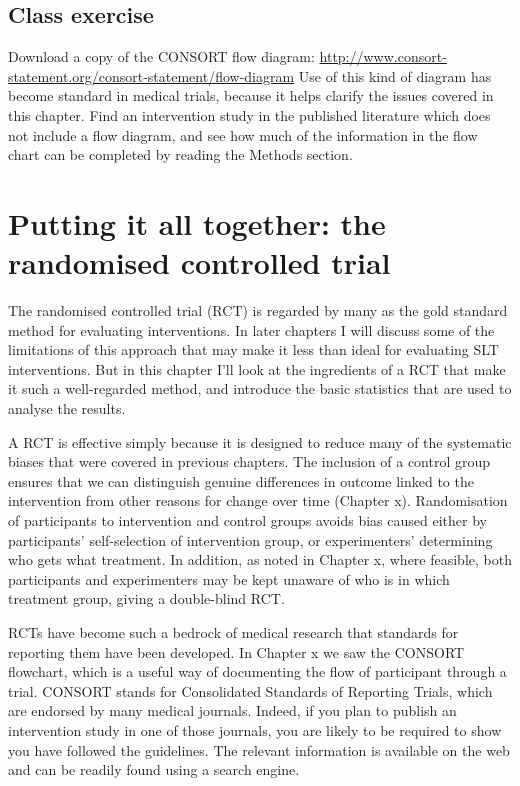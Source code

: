 \documentclass[]{book}
\begin{document}
\hypertarget{class-exercise-5}{%
\section{Class exercise}\label{class-exercise-5}}

Download a copy of the CONSORT flow diagram: \url{http://www.consort-statement.org/consort-statement/flow-diagram}
Use of this kind of diagram has become standard in medical trials, because it helps clarify the issues covered in this chapter.
Find an intervention study in the published literature which does not include a flow diagram, and see how much of the information in the flow chart can be completed by reading the Methods section.

\hypertarget{putting-it-all-together-the-randomised-controlled-trial}{%
\chapter{Putting it all together: the randomised controlled trial}\label{putting-it-all-together-the-randomised-controlled-trial}}

The randomised controlled trial (RCT) is regarded by many as the gold standard method for evaluating interventions. In later chapters I will discuss some of the limitations of this approach that may make it less than ideal for evaluating SLT interventions. But in this chapter I'll look at the ingredients of a RCT that make it such a well-regarded method, and introduce the basic statistics that are used to analyse the results.

A RCT is effective simply because it is designed to reduce many of the systematic biases that were covered in previous chapters. The inclusion of a control group ensures that we can distinguish genuine differences in outcome linked to the intervention from other reasons for change over time (Chapter x). Randomisation of participants to intervention and control groups avoids bias caused either by participants' self-selection of intervention group, or experimenters' determining who gets what treatment. In addition, as noted in Chapter x, where feasible, both participants and experimenters may be kept unaware of who is in which treatment group, giving a double-blind RCT.

RCTs have become such a bedrock of medical research that standards for reporting them have been developed. In Chapter x we saw the CONSORT flowchart, which is a useful way of documenting the flow of participant through a trial. CONSORT stands for Consolidated Standards of Reporting Trials, which are endorsed by many medical journals. Indeed, if you plan to publish an intervention study in one of those journals, you are likely to be required to show you have followed the guidelines. The relevant information is available on the web and can be readily found using a search engine.
\end{document}
